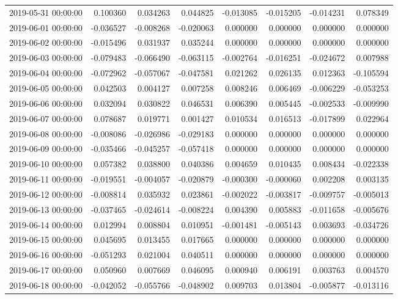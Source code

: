 \begin{tabular}{lrrrrrrr}
2019-05-31 00:00:00 & 0.100360 & 0.034263 & 0.044825 & -0.013085 & -0.015205 & -0.014231 & 0.078349 \\
2019-06-01 00:00:00 & -0.036527 & -0.008268 & -0.020063 & 0.000000 & 0.000000 & 0.000000 & 0.000000 \\
2019-06-02 00:00:00 & -0.015496 & 0.031937 & 0.035244 & 0.000000 & 0.000000 & 0.000000 & 0.000000 \\
2019-06-03 00:00:00 & -0.079483 & -0.066490 & -0.063115 & -0.002764 & -0.016251 & -0.024672 & 0.007988 \\
2019-06-04 00:00:00 & -0.072962 & -0.057067 & -0.047581 & 0.021262 & 0.026135 & 0.012363 & -0.105594 \\
2019-06-05 00:00:00 & 0.042503 & 0.004127 & 0.007258 & 0.008246 & 0.006469 & -0.006229 & -0.053253 \\
2019-06-06 00:00:00 & 0.032094 & 0.030822 & 0.046531 & 0.006390 & 0.005445 & -0.002533 & -0.009990 \\
2019-06-07 00:00:00 & 0.078687 & 0.019771 & 0.001427 & 0.010534 & 0.016513 & -0.017899 & 0.022964 \\
2019-06-08 00:00:00 & -0.008086 & -0.026986 & -0.029183 & 0.000000 & 0.000000 & 0.000000 & 0.000000 \\
2019-06-09 00:00:00 & -0.035466 & -0.045257 & -0.057418 & 0.000000 & 0.000000 & 0.000000 & 0.000000 \\
2019-06-10 00:00:00 & 0.057382 & 0.038800 & 0.040386 & 0.004659 & 0.010435 & 0.008434 & -0.022338 \\
2019-06-11 00:00:00 & -0.019551 & -0.004057 & -0.020879 & -0.000300 & -0.000060 & 0.002208 & 0.003135 \\
2019-06-12 00:00:00 & -0.008814 & 0.035932 & 0.023861 & -0.002022 & -0.003817 & -0.009757 & -0.005013 \\
2019-06-13 00:00:00 & -0.037465 & -0.024614 & -0.008224 & 0.004390 & 0.005883 & -0.011658 & -0.005676 \\
2019-06-14 00:00:00 & 0.012994 & 0.008804 & 0.010951 & -0.001481 & -0.005143 & 0.003693 & -0.034726 \\
2019-06-15 00:00:00 & 0.045695 & 0.013455 & 0.017665 & 0.000000 & 0.000000 & 0.000000 & 0.000000 \\
2019-06-16 00:00:00 & -0.051293 & 0.021004 & 0.040511 & 0.000000 & 0.000000 & 0.000000 & 0.000000 \\
2019-06-17 00:00:00 & 0.050960 & 0.007669 & 0.046095 & 0.000940 & 0.006191 & 0.003763 & 0.004570 \\
2019-06-18 00:00:00 & -0.042052 & -0.055766 & -0.048902 & 0.009703 & 0.013804 & -0.005877 & -0.013116 \\

\end{tabular}
